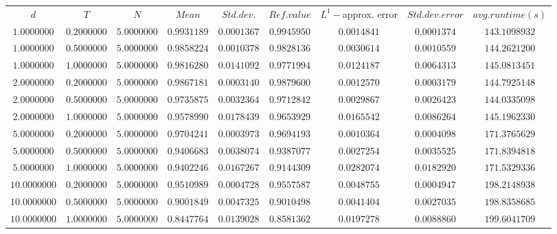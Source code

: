 \begin{tabular}{ccccccccc}
$d$ & $T$ & $N$ & $Mean$ & $Std. dev.$ & $Ref. value$ & $L^1-$approx. error & $Std. dev. error$ & $avg. runtime (s)$\\
$1.0000000$ & $0.2000000$ & $5.0000000$ & $0.9931189$ & $0.0001367$ & $0.9945950$ & $0.0014841$ & $0.0001374$ & $143.1098932$\\
$1.0000000$ & $0.5000000$ & $5.0000000$ & $0.9858224$ & $0.0010378$ & $0.9828136$ & $0.0030614$ & $0.0010559$ & $144.2621200$\\
$1.0000000$ & $1.0000000$ & $5.0000000$ & $0.9816280$ & $0.0141092$ & $0.9771994$ & $0.0124187$ & $0.0064313$ & $145.0813451$\\
$2.0000000$ & $0.2000000$ & $5.0000000$ & $0.9867181$ & $0.0003140$ & $0.9879600$ & $0.0012570$ & $0.0003179$ & $144.7925148$\\
$2.0000000$ & $0.5000000$ & $5.0000000$ & $0.9735875$ & $0.0032364$ & $0.9712842$ & $0.0029867$ & $0.0026423$ & $144.0335098$\\
$2.0000000$ & $1.0000000$ & $5.0000000$ & $0.9578990$ & $0.0178439$ & $0.9653929$ & $0.0165542$ & $0.0086264$ & $145.1962330$\\
$5.0000000$ & $0.2000000$ & $5.0000000$ & $0.9704241$ & $0.0003973$ & $0.9694193$ & $0.0010364$ & $0.0004098$ & $171.3765629$\\
$5.0000000$ & $0.5000000$ & $5.0000000$ & $0.9406683$ & $0.0038074$ & $0.9387077$ & $0.0027254$ & $0.0035525$ & $171.8394818$\\
$5.0000000$ & $1.0000000$ & $5.0000000$ & $0.9402246$ & $0.0167267$ & $0.9144309$ & $0.0282074$ & $0.0182920$ & $171.5329336$\\
$10.0000000$ & $0.2000000$ & $5.0000000$ & $0.9510989$ & $0.0004728$ & $0.9557587$ & $0.0048755$ & $0.0004947$ & $198.2148938$\\
$10.0000000$ & $0.5000000$ & $5.0000000$ & $0.9001849$ & $0.0047325$ & $0.9010498$ & $0.0041404$ & $0.0027035$ & $198.8358685$\\
$10.0000000$ & $1.0000000$ & $5.0000000$ & $0.8447764$ & $0.0139028$ & $0.8581362$ & $0.0197278$ & $0.0088860$ & $199.6041709$\\
\end{tabular}
